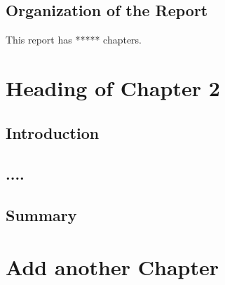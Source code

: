 \documentclass[12pt]{report}
\begin{document}
\section{Organization of the Report}

This report has ***** chapters. 
















\chapter{Heading of Chapter 2}

\section{Introduction}



\section{....}



\lipsum[2-4]






\section{Summary}































\chapter{Add another Chapter}
\end{document}
